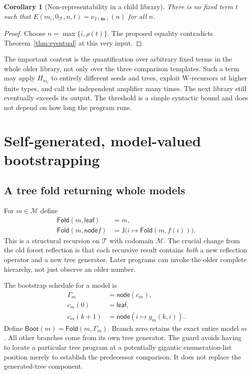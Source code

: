 \documentclass[11pt,letterpaper]{article}
\newtheorem{corollary}[theorem]{Corollary}
\theoremstyle{definition}
\newcommand{\Tree}{\mathcal T}
\newcommand{\Fam}{\mathcal F}
\newcommand{\Mod}{\mathcal M}
\newcommand{\leaf}{\mathsf{leaf}}
\newcommand{\node}{\mathsf{node}}
\renewcommand{\Join}{\mathsf J}
\newcommand{\Fold}{\mathsf{Fold}}
\newcommand{\Boot}{\mathsf{Boot}}
\begin{document}
\begin{corollary}[Non-representability in a child library]
\label{cor:nonrep}
There is no fixed term $t$ such that
$E(m_i,0_{\Fam},n,t)=\nu_{\Join(\mathbf m)}(n)$ for all $n$.
\end{corollary}
\begin{proof}
Choose $n=\max\{i,\rho(t)\}$. The proposed equality contradicts
Theorem~\ref{thm:eventual} at this very input.
\end{proof}

The important content is the quantification over arbitrary fixed terms in the
whole older library, not only over the three comparison templates. Such a term
may apply $H_{m_i}$ to entirely different seeds and trees, exploit W-recursors
at higher finite types, and call the independent amplifier many times. The
next library still eventually exceeds its output. The threshold is a simple
syntactic bound and does not depend on how long the program runs.

\section{Self-generated, model-valued bootstrapping}
\label{sec:bootstrap}

\subsection{A tree fold returning whole models}

For $m\in\Mod$ define
\begin{align}
 \Fold(m,\leaf)&=m,\\
 \Fold(m,\node f)&=\Join\bigl(i\mapsto\Fold(m,f(i))\bigr).
\label{eq:modelfold}
\end{align}
This is a structural recursion on $\Tree$ with codomain $\Mod$. The crucial
change from the old forest reflection is that each recursive result contains
\emph{both} a new reflection operator and a new tree generator. Later
programs can invoke the older complete hierarchy, not just observe an older
number.

The bootstrap schedule for a model is
\begin{align}
 \Gamma_m&=\node(c_m),\\
 c_m(0)&=\leaf,\\
 c_m(k+1)&=\node(i\mapsto g_m(k,i)).
\label{eq:guardindex}
\end{align}
Define $\Boot(m)=\Fold(m,\Gamma_m)$. Branch zero retains the exact entire
model $m$. All other branches come from its own tree generator. The guard
avoids having to locate a particular tree program at a potentially gigantic
enumeration-list position merely to establish the predecessor comparison.
It does not replace the generated-tree component.
\end{document}

